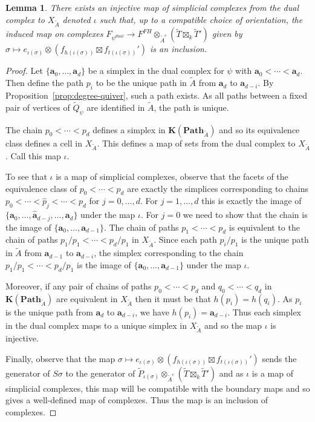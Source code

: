 \documentclass{amsart}
\newcommand{\field}{k}
\newcommand{\Path}{\mathbf{Path}}
\newcommand{\Order}{\mathbf{K}}
\newtheorem{lemma}[theorem]{Lemma}
\theoremstyle{remark}
\begin{document}
\begin{lemma}
  \label{lem:inclusion}
  There exists an injective map of simplicial complexes from the dual complex to $X_{\widetilde{A}}$ denoted $\iota$ such that, up to a compatible choice of orientation, the induced map on complexes $F_{\psi^{dual}}\rightarrow F^{FH}\otimes_{\widetilde{A}^e} (\widetilde{T}\boxtimes_{\field} \widetilde{T}')$ given by $\sigma \mapsto e_{\iota(\sigma)}\otimes (f_{h(\iota(\sigma))}\boxtimes f_{t(\iota(\sigma))}')$ is an inclusion.
\end{lemma}
\begin{proof}
  Let $\{\bm{a}_0,\ldots,\bm{a}_d\}$ be a simplex in the dual complex for $\psi$ with $\bm{a}_0<\cdots<\bm{a}_d$.
  Then define the path $p_i$ to be the unique path in $\widetilde{A}$ from $\bm{a}_d$ to $\bm{a}_{d-i}$.
  By Proposition~\ref{prop:degree-quiver}, such a path exists.
  As all paths between a fixed pair of vertices of $\widetilde{Q}_\psi$ are identified in $\widetilde{A}$, the path is unique.

  The chain $p_0< \cdots < p_d$ defines a simplex in $\Order(\Path_{\widetilde{A}})$
  and so its equivalence class defines a cell in $X_{\widetilde{A}}$.
  This defines a map of sets from the dual complex to $X_{\widetilde{A}}$. Call this map $\iota$.

  To see that $\iota$ is a map of simplicial complexes, observe that the facets of the equivalence class of $p_0 < \cdots < p_d$ are exactly the simplices corresponding to chains $p_0< \cdots < \widehat{p}_j < \cdots < p_d$ for $j=0,\ldots,d$.
  For $j=1,\ldots,d$ this is exactly the image of $\{\bm{a}_0,\ldots,\widehat{\bm{a}}_{d-j},\ldots,\bm{a}_d\}$
  under the map $\iota$.
  For $j=0$ we need to show that the chain is the image of $\{\bm{a}_0,\ldots,\bm{a}_{d-1}\}$.
  The chain of paths $p_1< \cdots < p_d$ is equivalent to the chain of paths $p_1/p_1< \cdots < p_d/p_1$ in $X_{\widetilde{A}}$.
  Since each path $p_i/p_1$ is the unique path in $\widetilde{A}$ from $\bm{a}_{d-1}$ to $\bm{a}_{d-i}$, the simplex corresponding to the chain $p_1/p_1 < \cdots < p_d/p_1$ is the image of $\{\bm{a}_0,\ldots,\bm{a}_{d-1}\}$ under the map $\iota$.

  Moreover, if any pair of chains of paths $p_0< \cdots < p_d$ and $q_0< \cdots < q_d$ in $\Order(\Path_{\widetilde{A}})$ are equivalent in $X_{\widetilde{A}}$ then it must be that $h(p_i)=h(q_i)$. As $p_i$ is the unique path from $\bm{a}_d$ to $\bm{a}_{d-i}$, we have $h(p_i)=\bm{a}_{d-i}$. Thus each simplex in the dual complex maps to a unique simplex in $X_{\widetilde{A}}$ and so the map $\iota$ is injective.

  Finally, observe that the map $\sigma \mapsto e_{\iota(\sigma)}\otimes (f_{h(\iota(\sigma))}\boxtimes f_{t(\iota(\sigma))}')$ sends the generator of $S\sigma$ to the generator of $\widetilde{P}_{\iota(\sigma)}\otimes_{\widetilde{A}^e} (\widetilde{T}\boxtimes_{\field} \widetilde{T}')$ and as $\iota$ is a map of simplicial complexes, this map will be compatible with the boundary maps and so gives a well-defined map of complexes. Thus the map is an inclusion of complexes.
\end{proof}
\end{document}
